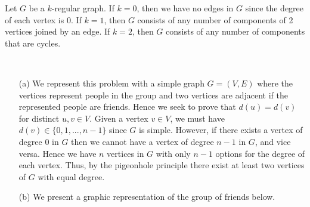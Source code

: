 \begin{ans}
Let $G$ be a $k$-regular graph. If $k=0$, then we have no edges in $G$ since the degree of each vertex is 0. If $k=1$, then $G$ consists of any number of components of 2 vertices joined by an edge. If $k=2$, then $G$ consists of any number of components that are cycles.
\end{ans}

\begin{ans} \
\begin{itemize}
	\item[(a)] We represent this problem with a simple graph $G = (V,E)$ where the vertices represent people in the group and two vertices are adjacent if the represented people are friends. Hence we seek to prove that $d(u) = d(v)$ for distinct $u,v \in V$. Given a vertex $v \in V$, we must have $d(v) \in \{0,1,...,n-1\}$ since $G$ is simple. However, if there exists a vertex of degree 0 in $G$ then we cannot have a vertex of degree $n-1$ in $G$, and vice versa. Hence we have $n$ vertices in $G$ with only $n-1$ options for the degree of each vertex. Thus, by the pigeonhole principle there exist at least two vertices of $G$ with equal degree.
	\item[(b)] We present a graphic representation of the group of friends below.
	\begin{center}
	\end{center}
\end{itemize}
\end{ans}